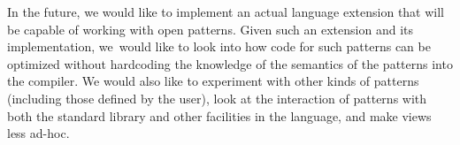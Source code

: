 In the future, we would like to implement an actual language 
extension that will be capable of working with open patterns.  Given such an extension and its implementation,
we~would like to look into how code for such 
patterns can be optimized without hardcoding the knowledge of the semantics of the patterns
into the compiler. 
We would also like to experiment with other kinds of patterns (including those defined by the user),
look at the interaction of patterns with both the standard library and 
other facilities in the language, and make views less ad-hoc.



